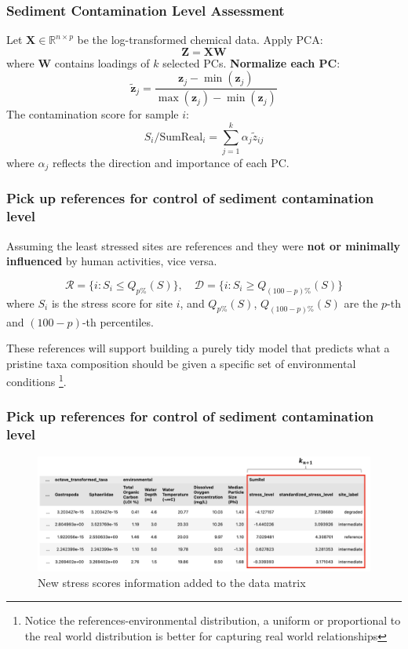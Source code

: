 \documentclass{beamer}
\begin{document}
\begin{frame}
\frametitle{Sediment Contamination Level Assessment}

Let $\mathbf{X} \in \mathbb{R}^{n \times p}$ be the log-transformed chemical data. Apply PCA:
\[
\mathbf{Z} = \mathbf{X} \mathbf{W}
\]
where $\mathbf{W}$ contains loadings of $k$ selected PCs. \textbf{Normalize each PC}:
\[
\tilde{\mathbf{z}}_j = \frac{\mathbf{z}_j - \min(\mathbf{z}_j)}{\max(\mathbf{z}_j) - \min(\mathbf{z}_j)}
\]
The contamination score for sample $i$:
\[
S_i/ \text{SumReal}_i = \sum_{j=1}^k \alpha_j \tilde{z}_{ij}
\]
where $\alpha_j$ reflects the direction and importance of each PC.

\end{frame}


\begin{frame}
\frametitle{Pick up references for control of sediment contamination level}
Assuming the least stressed sites are references and they were \textbf{not or minimally influenced} by human activities,
vice versa.

\[
\mathcal{R} = \{ i : S_i \leq Q_{p\%}(S) \}, \quad
\mathcal{D} = \{ i : S_i \geq Q_{(100-p)\%}(S) \}
\]
where $S_i$ is the stress score for site $i$, and $Q_{p\%}(S)$, $Q_{(100-p)\%}(S)$ are the $p$-th and $(100-p)$-th percentiles.


These references will support building a purely tidy model that predicts what
a pristine taxa composition should be given a specific set of environmental conditions
\footnote{
Notice the references-environmental distribution, a uniform or proportional to the real world distribution
is better for capturing real world relationships}.

\end{frame} 

\begin{frame}
\frametitle{Pick up references for control of sediment contamination level}

\begin{figure}
\centering
\includegraphics[width=\textwidth]{figures/p8_added_stress_scores.png}
\caption{New stress scores information added to the data matrix}
\end{figure}

\end{frame}
\end{document}
